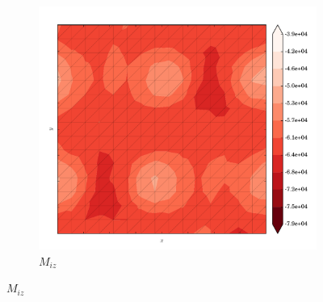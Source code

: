 \begin{figure}
  \begin{subfigure}[b]{0.3\linewidth}
    \includegraphics[width=\linewidth]{images/stress_balance/BP/M_iz.pdf}
  \caption{$M_{iz}$}
  \label{bp_M_iz}
  \end{subfigure}


\end{figure}
